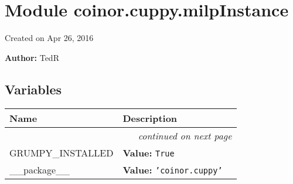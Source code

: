 %
%
%


\section{Module coinor.cuppy.milpInstance}

    \label{coinor:cuppy:milpInstance}
Created on Apr 26, 2016

\textbf{Author:} TedR





  \subsection{Variables}

    \vspace{-1cm}
\hspace{\varindent}\begin{longtable}{|p{\varnamewidth}|p{\vardescrwidth}|l}
\cline{1-2}
\cline{1-2} \centering \textbf{Name} & \centering \textbf{Description}& \\
\cline{1-2}
\endhead\cline{1-2}\multicolumn{3}{r}{\small\textit{continued on next page}}\\\endfoot\cline{1-2}
\endlastfoot\raggedright G\-R\-U\-M\-P\-Y\-\_\-I\-N\-S\-T\-A\-L\-L\-E\-D\- & \raggedright \textbf{Value:} 
{\tt True}&\\
\cline{1-2}
\raggedright \_\-\_\-p\-a\-c\-k\-a\-g\-e\-\_\-\_\- & \raggedright \textbf{Value:} 
{\tt \texttt{'}\texttt{coinor.cuppy}\texttt{'}}&\\
\cline{1-2}
\end{longtable}



